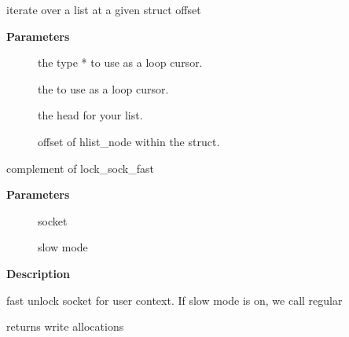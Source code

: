 \documentclass[a4paper,8pt,english]{sphinxmanual}
\begin{document}
\begin{fulllineitems}
\label{networking/kapi:c.sk_for_each_entry_offset_rcu}
iterate over a list at a given struct offset

\end{fulllineitems}


\textbf{Parameters}
\begin{description}
\item[{}] \leavevmode
the type * to use as a loop cursor.

\item[{}] \leavevmode
the  to use as a loop cursor.

\item[{}] \leavevmode
the head for your list.

\item[{}] \leavevmode
offset of hlist\_node within the struct.

\end{description}

\begin{fulllineitems}
\label{networking/kapi:c.unlock_sock_fast}
complement of lock\_sock\_fast

\end{fulllineitems}


\textbf{Parameters}
\begin{description}
\item[{}] \leavevmode
socket

\item[{}] \leavevmode
slow mode

\end{description}

\textbf{Description}

fast unlock socket for user context.
If slow mode is on, we call regular 

\begin{fulllineitems}
\label{networking/kapi:c.sk_wmem_alloc_get}
returns write allocations

\end{fulllineitems}
\end{document}
